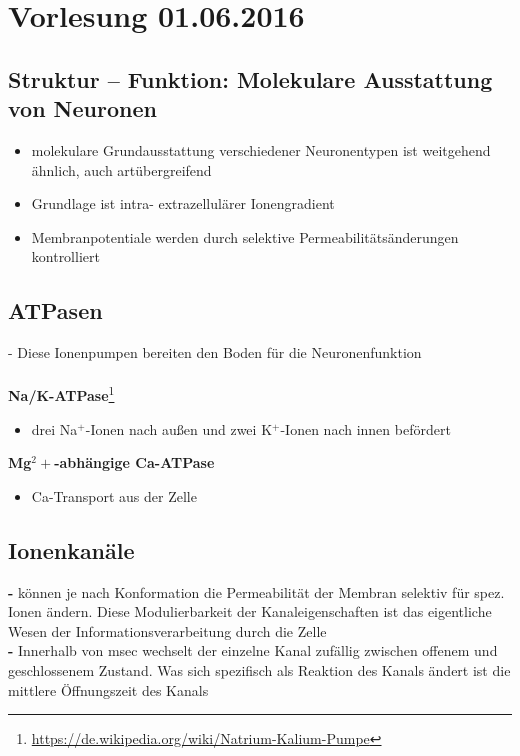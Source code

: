 \section{Vorlesung 01.06.2016}

\subsection{Struktur -- Funktion: Molekulare Ausstattung von Neuronen}
\begin{itemize}
	\item molekulare Grundausstattung verschiedener Neuronentypen ist weitgehend ähnlich, auch artübergreifend
	\item Grundlage ist intra- extrazellulärer Ionengradient
	\item Membranpotentiale werden durch selektive Permeabilitätsänderungen kontrolliert
\end{itemize}

\subsection{ATPasen}
 - Diese Ionenpumpen bereiten den Boden für die Neuronenfunktion
\\\\
\textbf{Na/K-ATPase}\footnote{\url{https://de.wikipedia.org/wiki/Natrium-Kalium-Pumpe}}
\begin{itemize}
	\item drei Na$^+$-Ionen nach außen und zwei K$^+$-Ionen nach innen befördert
\end{itemize}

\textbf{Mg$^2+$-abhängige Ca-ATPase}
\begin{itemize}
	\item Ca-Transport aus der Zelle
\end{itemize}

\subsection{Ionenkanäle}
\textbf{ - }können je nach Konformation die Permeabilität der Membran selektiv für spez. Ionen ändern. Diese Modulierbarkeit der Kanaleigenschaften ist das eigentliche Wesen der Informationsverarbeitung durch die Zelle\\
\textbf{ - }Innerhalb von msec wechselt der einzelne Kanal zufällig zwischen offenem und geschlossenem Zustand. Was sich spezifisch als Reaktion des Kanals ändert ist die mittlere Öffnungszeit des Kanals\\

